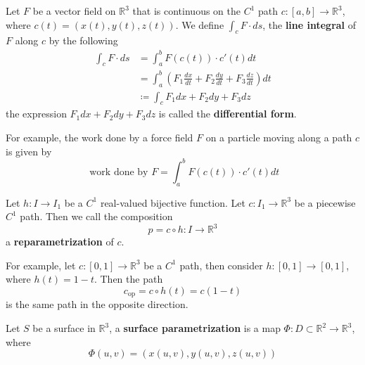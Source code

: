 \documentclass[openany]{book}
\newcommand{\R}{\mathbb{R}}
\begin{document}
\begin{defn}
    Let $F$ be a vector field on $\R^3$ that is continuous on the $C^1$ path $c:[a,b]\to\R^3$, where $c(t)=(x(t), y(t), z(t))$. We define $\int_c F\cdot ds$, the \textbf{line integral} of $F$ along $c$ by the following
    \begin{align*}
        \int_c F\cdot ds&=\int_a^bF(c(t))\cdot c'(t)dt\\
        &=\int_a^b \left(F_1\frac{dx}{dt}+F_2\frac{dy}{dt}+F_3\frac{dz}{dt}\right)dt\\
        &\coloneq\int_c F_1dx+F_2dy+F_3dz
    \end{align*}
    the expression $F_1dx+F_2dy+F_3dz$ is called the \textbf{differential form}. 
    
    For example, the work done by a force field $F$ on a particle moving along a path $c$ is given by 
    \begin{equation*}
        \text{ work done by } F=\int_a^bF(c(t))\cdot c'(t)dt
    \end{equation*}
\end{defn}



\begin{defn}[reparametrization]
    Let $h: I\to I_1$ be a $C^1$ real-valued bijective function. Let $c: I_1\to\R^3$ be a piecewise $C^1$ path. Then we call the composition 
    \begin{equation*}
        p=c\circ h: I\to\R^3
    \end{equation*}
    a \textbf{reparametrization} of $c$.

    For example, let $c:[0,1]\to\R^3$ be a $C^1$ path, then consider $h: [0,1]\to [0,1]$, where $h(t)=1-t$. Then the path 
    \begin{equation*}
        c_{\text{op}}=c\circ h(t)=c(1-t)
    \end{equation*}
    is the same path in the opposite direction.
\end{defn}



\begin{defn}
    Let $S$ be a surface in $\R^3$, a \textbf{surface parametrization} is a map $\Phi:D\subset\R^2\to\R^3$, where 
    \begin{equation*}
        \Phi(u,v)=(x(u,v), y(u,v), z(u,v))
    \end{equation*}
\end{defn}
\end{document}
